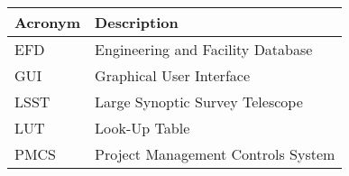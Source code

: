 \addtocounter{table}{-1}
\begin{longtable}{p{}p{}}\hline
\textbf{Acronym} & \textbf{Description}  \\\hline

EFD & Engineering and Facility Database \\\hline
GUI & Graphical User Interface \\\hline
LSST & Large Synoptic Survey Telescope \\\hline
LUT & Look-Up Table \\\hline
PMCS & Project Management Controls System \\\hline
\end{longtable}

